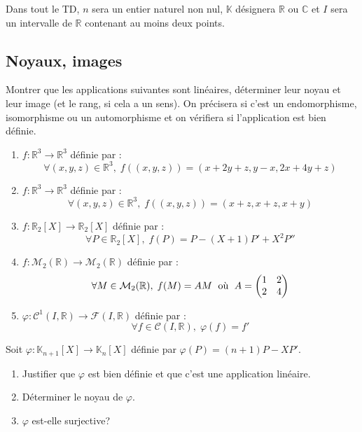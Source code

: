 \documentclass[a4paper,twoside,french,11pt]{VcCours}
\begin{document}

\tableofcontents
\separationTitre


Dans tout le TD, $n$ sera un entier naturel non nul, $\mathbb{K}$ désignera $\mathbb{R}$ ou $\mathbb{C}$ et $I$ sera un intervalle de $\mathbb{R}$ contenant au moins deux points.

\medskip

\subsection{\large Noyaux, images}


\begin{Exercice}{} Montrer que les applications suivantes sont linéaires, déterminer leur noyau et leur image (et le rang, si cela a un sens). On précisera si c'est un endomorphisme, isomorphisme ou un automorphisme et on vérifiera si l'application est bien définie.

\begin{enumerate}
\item $f : \mathbb{R}^3 \rightarrow \mathbb{R}^3$ définie par :
$$ \forall (x,y,z) \in \mathbb{R}^3, \; f((x,y,z))= (x+2y+z,y-x,2x+4y+z)$$
\item $f : \mathbb{R}^3 \rightarrow \mathbb{R}^3$ définie par :
$$ \forall (x,y,z) \in \mathbb{R}^3, \; f((x,y,z))= (x+z,x+z,x+y)$$
\item $f : \mathbb{R}_2[X] \rightarrow \mathbb{R}_2[X]$ définie par :
$$ \forall P \in \mathbb{R}_2[X], \; f(P)=P-(X+1)P'+X^2 P''$$
\item $f : \mathcal{M}_2(\mathbb{R}) \rightarrow \mathcal{M}_2(\mathbb{R})$ définie par :
$$ \forall M \in \mathcal{M}_2(\mathbb{R}), \; f(M)=AM \; \hbox{ où } \; A= \begin{pmatrix}
1 & 2 \\
2 & 4 \\
\end{pmatrix} $$
\item $\varphi : \mathcal{C}^1(I, \mathbb{R}) \rightarrow \mathcal{F}(I, \mathbb{R})$ définie par :
$$ \forall f \in \mathcal{C}(I, \mathbb{R}), \; \varphi(f)=f'$$
\end{enumerate}
\end{Exercice}

\begin{Exercice}{} Soit $\varphi : \mathbb{K}_{n+1}[X]\rightarrow \mathbb{K}_{n}[X]$ définie par $\varphi(P) = (n + 1)P - XP'$.
    \begin{enumerate}
      \item
        Justifier que $\varphi$ est bien définie et que c'est une application linéaire.
      \item
        Déterminer le noyau de $\varphi$.
      \item
        $\varphi$ est-elle surjective?
    \end{enumerate}
\end{Exercice}
\end{document}
